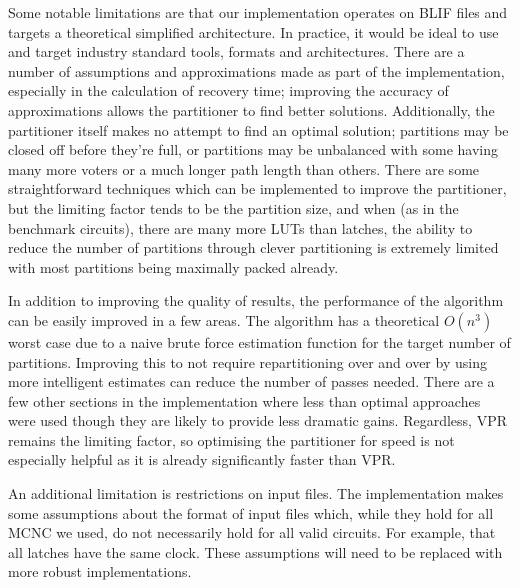 \documentclass[12pt,final,oneside]{dwThesis} %
\begin{document}
   Some notable limitations are that our implementation operates on \gls{BLIF}
   files and targets a theoretical simplified architecture. In practice, it
   would be ideal to use and target industry standard tools, formats and
   architectures.  There are a number of assumptions and approximations made as
   part of the implementation, especially in the calculation of recovery time;
   improving the accuracy of approximations allows the partitioner to find
   better solutions. Additionally, the partitioner itself makes no attempt to
   find an optimal solution; partitions may be closed off before they're full,
   or partitions may be unbalanced with some having many more voters or a much
   longer path length than others.
   There are some straightforward techniques which can be implemented to improve the partitioner, but the limiting factor tends to be the partition size, and when (as in
   the benchmark circuits), there are many more \glspl{LUT} than latches, the
   ability to reduce the number of partitions through clever partitioning is
   extremely limited with most partitions being maximally packed already.
   
   In addition to improving the quality of results, the performance of the algorithm can be easily improved in a few areas.
   The algorithm has a theoretical $O(n^3)$ worst case due to a naive brute force estimation function for the target number of partitions.
   Improving this to not require repartitioning over and over by using more intelligent estimates can reduce the number of passes needed.
   There are a few other sections in the implementation where less than optimal approaches were used though they are likely to provide less dramatic gains.
   Regardless, \gls{VPR} remains the limiting factor, so optimising the partitioner for speed is not especially helpful as it is already significantly faster than \gls{VPR}.
   
   An additional limitation is restrictions on input files.
   The implementation makes some assumptions about the format of input files which, while they hold for all \gls{MCNC} we used, do not necessarily hold for all valid circuits.
   For example, that all latches have the same clock.
   These assumptions will need to be replaced with more robust implementations.
\end{document}
